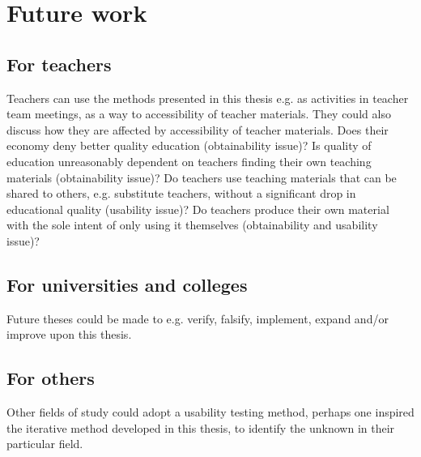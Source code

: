 \section{Future work}
	
\subsection{For teachers}
Teachers can use the methods presented in this thesis e.g. as activities in teacher team meetings, as a way to accessibility of teacher materials. They could also discuss how they are affected by accessibility of teacher materials. 
Does their economy deny better quality education (obtainability issue)? Is quality of education unreasonably dependent on teachers finding their own teaching materials (obtainability issue)? Do teachers use teaching materials that can be shared to others, e.g. substitute teachers, without a significant drop in educational quality (usability issue)? Do teachers produce their own material with the sole intent of only using it themselves (obtainability and usability issue)?
\subsection{For universities and colleges}
Future theses could be made to e.g. verify, falsify, implement, expand and/or improve upon this thesis.
\subsection{For others}
Other fields of study could adopt a usability testing method, perhaps one inspired the iterative method developed in this thesis, to identify the unknown in their particular field. 